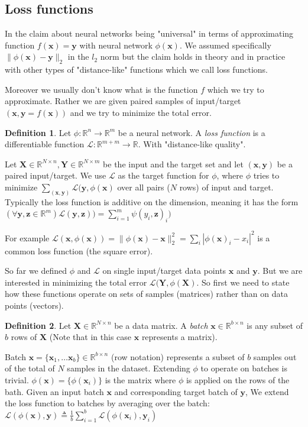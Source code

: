 \documentclass[11pt, a4paper]{report}
\theoremstyle{plain}
\theoremstyle{definition}
\newtheorem{mydef}{Definition}[chapter]
\theoremstyle{remark}
\newcommand{\R}{\mathbb{R}}
\newcommand{\X}{\mathbf{X}}
\newcommand{\x}{\mathbf{x}}
\newcommand{\z}{\mathbf{z}}
\newcommand{\Y}{\mathbf{Y}}
\newcommand{\y}{\mathbf{y}}
\newcommand{\bv}[1]{\boldsymbol{#1}}
\begin{document}
\subsection{Loss functions}


In the claim about neural networks being "universal" in terms of approximating
function $f(\x)=\y$ with neural network $\phi(\x)$. We assumed specifically
$\|\phi(\x) - \y \|_2$ in the $l_2$ norm but the claim holds in theory and in
practice with other types of "distance-like" functions which we call loss
functions.

Moreover we usually don't know what is the function $f$ which we try to
approximate. Rather we are given 
paired samples of input/target $(\x, \y=f(\x))$ and we
try to minimize the total error.

\begin{mydef}
\label{def:lossfunc}
Let $\phi :\R^n \to \R^m$ be a neural network.
A \textit{loss function} is a differentiable
function $\mathcal{L} : \R^{m+m} \to \R$. 
With "distance-like quality".
\end{mydef}

Let $\X \in \R^{N \times n}, \Y \in \R^{N \times m}$ be the input and the target
set and let $(\x,\y)$ be a paired input/target. 
We use $\mathcal{L}$ as the target function for $\phi$,
where $\phi$ tries to minimize $\sum_{(\x,\y)}\mathcal{L}(\y, \phi(\x)$ over all
pairs ($N$ rows) of input and target.
Typically the loss function is additive on the dimension, meaning it has the
form $(\forall \y,\z \in \R^m) \mathcal{L}(\y, \z)) = \sum_{i=1}^m \psi(y_i, \z)_i)$

For example
$\mathcal{L}(\x, \phi(\x)) = \|\phi(\x) - \x\|_2^2 = 
\sum_i |\phi(\x)_i - x_i|^2$ is a common loss function (the
square error).

So far we defined $\phi$ and $\mathcal{L}$ on single input/target data points
$\x$ and $\y$. But we are interested in minimizing the total error
$\mathcal{L}(\Y, \phi(\X)$. So first we need to state how these functions
operate on sets of samples (matrices) rather than on data points (vectors).

\begin{mydef}
\label{def:batch}
Let $\bv{X} \in  \R^{N \times n}$ be a data matrix. A \emph{batch}
$\bv{x} \in \R^{b \times n}$ is any subset of $b$ rows of $\bv{X}$
(Note that in this case $\x$ represents a matrix).
\end{mydef}

Batch $\x = \{\x_1, \dots \x_b\} \in \R^{b \times n}$ (row notation)
represents a subset of $b$ samples out of the total of $N$ samples in the
dataset.
Extending $\phi$ to operate on batches is trivial.
$\phi(\x) = \{\phi(\x_i)\}$ is the matrix where $\phi$ is applied on the rows of the bath.
Given an input batch $\x$ and corresponding target batch of $\y$,
We extend the loss function to batches by averaging over the batch:
$\mathcal{L}(\phi(\x), \y) \triangleq \frac{1}{b} 
\sum_{i=1}^b \mathcal{L}(\phi(\x_i), \y_i)
$
\end{document}
